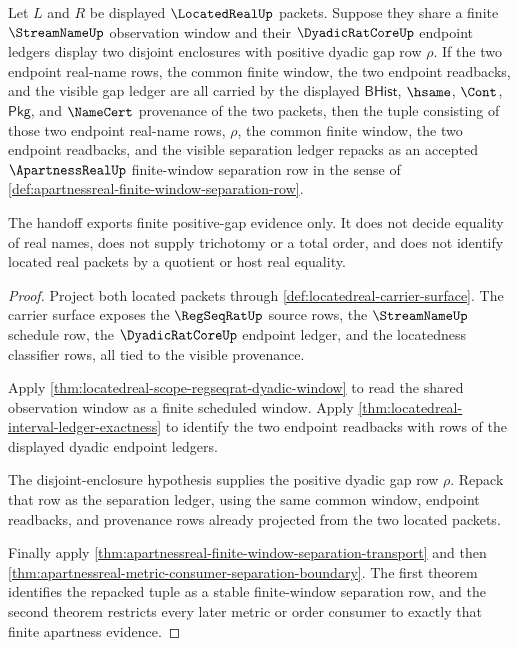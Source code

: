 \begin{theorem}
\label{thm:apartnessreal-located-window-positive-gap-handoff}
Let $L$ and $R$ be displayed $\LocatedRealUp$ packets. Suppose they share a finite $\StreamNameUp$ observation window and their $\DyadicRatCoreUp$ endpoint ledgers display two disjoint enclosures with positive dyadic gap row $\rho$. If the two endpoint real-name rows, the common finite window, the two endpoint readbacks, and the visible gap ledger are all carried by the displayed $\mathsf{BHist}$, $\hsame$, $\Cont$, $\mathsf{Pkg}$, and $\NameCert$ provenance of the two packets, then the tuple consisting of those two endpoint real-name rows, $\rho$, the common finite window, the two endpoint readbacks, and the visible separation ledger repacks as an accepted $\ApartnessRealUp$ finite-window separation row in the sense of \autoref{def:apartnessreal-finite-window-separation-row}.

The handoff exports finite positive-gap evidence only. It does not decide equality of real names, does not supply trichotomy or a total order, and does not identify located real packets by a quotient or host real equality.
\end{theorem}
\begin{proof}
Project both located packets through \autoref{def:locatedreal-carrier-surface}. The carrier surface exposes the $\RegSeqRatUp$ source rows, the $\StreamNameUp$ schedule row, the $\DyadicRatCoreUp$ endpoint ledger, and the locatedness classifier rows, all tied to the visible provenance.

Apply \autoref{thm:locatedreal-scope-regseqrat-dyadic-window} to read the shared observation window as a finite scheduled window. Apply \autoref{thm:locatedreal-interval-ledger-exactness} to identify the two endpoint readbacks with rows of the displayed dyadic endpoint ledgers.

The disjoint-enclosure hypothesis supplies the positive dyadic gap row $\rho$. Repack that row as the separation ledger, using the same common window, endpoint readbacks, and provenance rows already projected from the two located packets.

Finally apply \autoref{thm:apartnessreal-finite-window-separation-transport} and then \autoref{thm:apartnessreal-metric-consumer-separation-boundary}. The first theorem identifies the repacked tuple as a stable finite-window separation row, and the second theorem restricts every later metric or order consumer to exactly that finite apartness evidence.
\end{proof}

